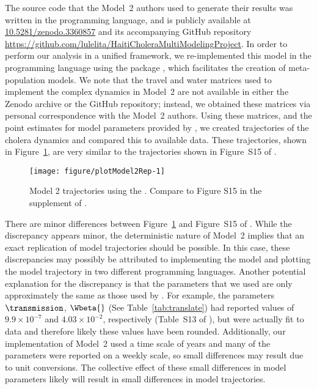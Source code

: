 The source code that the Model~2 authors used to generate their results was written in the  programming language, and is publicly available at \url{10.5281/zenodo.3360857} and its accompanying GitHub repository \url{https://github.com/lulelita/HaitiCholeraMultiModelingProject}.
In order to perform our analysis in a unified framework, we re-implemented this model in the  programming language using the  package \citep{asfaw23arxiv}, which facilitates the creation of meta-population models.
We note that the travel and water matrices used to implement the complex dynamics in Model~2 \citep{lee20sup} are not available in either the Zenodo archive or the GitHub repository;
instead, we obtained these matrices via personal correspondence with the Model~2 authors.
Using these matrices, and the point estimates for model parameters provided by \citep{lee20sup}, we created trajectories of the cholera dynamics and compared this to available data.
These trajectories, shown in Figure~\ref{fig:mod2rep}, are very similar to the trajectories shown in Figure~S15 of \cite{lee20sup}.




\begin{figure}[!h]
\begin{knitrout}
\color{fgcolor}

{\centering \texttt{[image: figure/plotModel2Rep-1]} 

}


\end{knitrout}
\caption{\label{fig:mod2rep}
Model 2 trajectories using the . Compare to Figure S15 in the supplement of \cite{lee20sup}.
}
\end{figure}

There are minor differences between Figure~\ref{fig:mod2rep} and Figure~S15 of \cite{lee20sup}.
While the discrepancy appears minor, the deterministic nature of Model~2 implies that an exact replication of model trajectories should be possible.
In this case, these discrepancies may possibly be attributed to implementing the model and plotting the model trajectory in two different programming languages.
Another potential explanation for the discrepancy is that the parameters that we used are only approximately the same as those used by \citet{lee20sup}.
For example, the parameters $\transmission$, $\Wbeta{}$ (See Table~\ref{tab:translate}) had reported values of $9.9 \times 10^{-7}$ and $4.03 \times 10^{-2}$, respectively (Table~S13 of \cite{lee20sup}), but were actually fit to data and therefore likely these values have been rounded.
Additionally, our implementation of Model~2 used a time scale of years and many of the parameters were reported on a weekly scale, so small differences may result due to unit conversions.
The collective effect of these small differences in model parameters likely will result in small differences in model trajectories.

